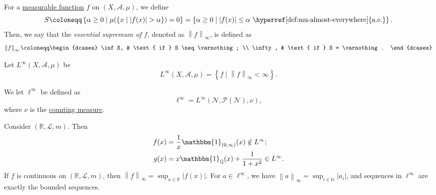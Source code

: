 \begin{definition}\label{def:essential-sumpremum}
	For a \hyperref[def:measurable-function]{measurable function} \(f\) on \((X, \mathcal{A} , \mu )\), we define
	\[
		S \coloneqq \left\{\alpha \geq 0\mid \mu (\{x\mid \left\vert f(x) \right\vert > \alpha \}) = 0\right\}
		= \left\{\alpha \geq 0\mid \left\vert f(x) \right\vert \leq \alpha \text{ \hyperref[def:mu-almost-everywhere]{a.e.}} \right\}.
	\]
	Then, we say that the \emph{essential supremum of \(f\)}, denoted as \(\left\lVert f\right\rVert _\infty \), is defined as
	\[
		\left\lVert f\right\rVert _\infty \coloneqq \begin{dcases}
			\inf S,  & \text{ if } S \neq \varnothing; \\
			\infty , & \text{ if } S = \varnothing.
		\end{dcases}
	\]
\end{definition}
\begin{definition}\label{def:L-infinity-space}
	Let \(L^{\infty} (X, \mathcal{A} , \mu )\) be
	\[
		L^{\infty} (X, \mathcal{A} , \mu ) = \left\{f\mid \left\lVert f\right\rVert _\infty < \infty \right\}.
	\]
\end{definition}

\begin{definition}\label{def:l-infinity-space}
	We let \(\ell ^{\infty} \) be defined as
	\[
		\ell ^{\infty} = L^{\infty} (\mathcal{N} , \mathcal{P} (\mathcal{N} ), \nu ),
	\]
	where \(\nu\) is the \hyperref[eg:counting-measure]{counting measure}.
\end{definition}

\begin{eg}
	Consider \((\mathbb{R} , \mathcal{L} , m)\). Then
	\[
		\begin{split}
			f(x) &= \frac{1}{x} \mathbbm{1}_{(0, \infty )} (x) \notin L^{\infty}; \\
			g(x) &= x \mathbbm{1}_{\mathbb{Q} }(x) + \frac{1}{1 + x^{2} } \in L^{\infty}.
		\end{split}
	\]
	If \(f\) is continuous on \((\mathbb{R} , \mathcal{L} , m)\), then \(\left\lVert f\right\rVert _\infty = \sup _{x\in \mathbb{R} }\left\vert f(x) \right\vert \).
	For \(a\in \ell ^{\infty} \), we have \(\left\lVert a\right\rVert _\infty = \sup _{i\in \mathbb{N} }\left\vert a_{i}  \right\vert\), and sequences in \(\ell ^{\infty} \)
	are exactly the bounded sequences.
\end{eg}

